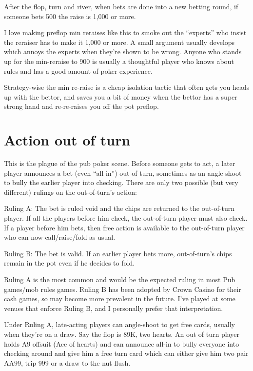 After the flop, turn and river, when bets are done into a new
betting round, if someone bets 500 the raise is 1,000 or more.

I love making preflop min reraises like this to smoke out
the ``experts'' who insist the reraiser has to make it 1,000
or more. A small argument usually develops which annoys the
experts when they're shown to be wrong. Anyone who stands
up for the min-reraise to 900 is usually a thoughtful player
who knows about rules and has a good amount of poker experience.

Strategy-wise the min re-raise is a cheap isolation tactic
that often gets you heads up with the bettor, and saves you
a bit of money when the bettor has a super strong hand and
re-re-raises you off the pot preflop.

\section{Action out of turn}

This is the plague of the pub poker scene. Before
someone gets to act, a later player announces a bet (even ``all in'')
out of turn, sometimes as an angle shoot to bully the earlier player
into checking. There are only two possible (but very different)
rulings on the out-of-turn's action:

Ruling A: The bet is ruled void and the chips are returned to the out-of-turn
player. If all the players before him check, the out-of-turn player
must also check. If a player before him bets, then free
action is available to the out-of-turn player who can now call/raise/fold
as usual.

Ruling B: The bet is valid. If an earlier player bets more, out-of-turn's chips
remain in the pot even if he decides to fold. 

Ruling A is the most common and would be the expected ruling in most
Pub games/mob rules games. Ruling B has been adopted
by Crown Casino for their cash games, so may become more prevalent
in the future. I've played at some venues that enforce Ruling B, and
I personally prefer that interpretation.

Under Ruling A, late-acting players can angle-shoot to get free
cards, usually when they're on a draw. Say the flop is 89K, two hearts.
An out of turn player holds A9 offsuit (Ace of hearts) and can announce
all-in to bully everyone into checking around and give him a free
turn card which can either give him two pair AA99, trip 999 or a draw
to the nut flush.

